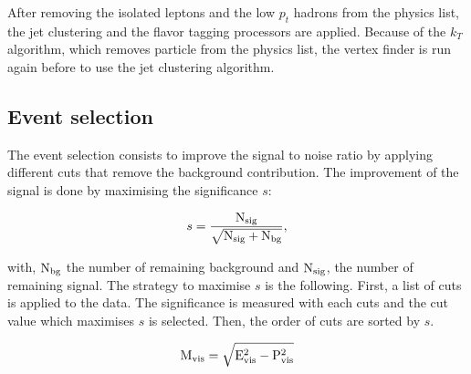     After removing the isolated leptons and the low $p_{t}$ hadrons from the physics list, the jet clustering and the flavor tagging processors are applied. 
    Because of the $k_{T}$ algorithm, which removes particle from the physics list, the vertex finder is run again before to use the jet clustering algorithm.

  \subsection{Event selection}

  The event selection consists to improve the signal to noise ratio by applying different cuts that remove the background contribution.
  The improvement of the signal is done by maximising the significance $s$:

  \begin{equation}
    s = \frac{\rm{N_{sig}}}{\sqrt{\rm{N_{sig}}+ \rm{N_{bg}}}},
  \end{equation}

  with, $\rm{N_{bg}}$ the number of remaining background and $\rm{N_{sig}}$, the number of remaining signal.
  The strategy to maximise $s$ is the following.
  First, a list of cuts is applied to the data.
  The significance is measured with each cuts and the cut value which maximises $s$ is selected.
  Then, the order of cuts are sorted by $s$.

  \begin{equation}
   \rm{M_{vis}} = \sqrt{E^2_{vis} - P^2_{vis}}
  \end{equation}

